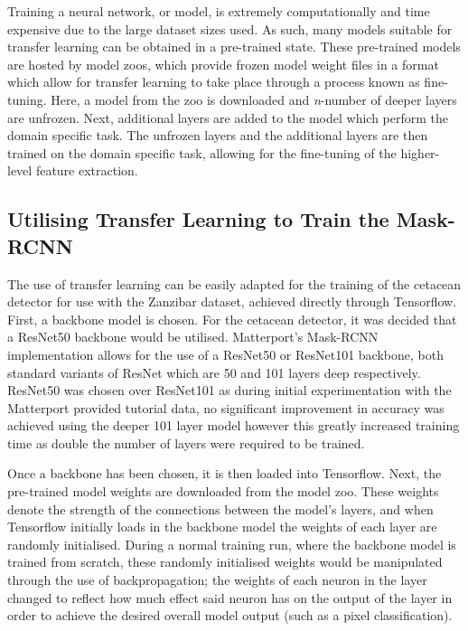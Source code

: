 Training a neural network, or model, is extremely computationally and time expensive due to the large dataset sizes used. As such, many models suitable for transfer learning can be obtained in a pre-trained state. These pre-trained models are hosted by model zoos, which provide frozen model weight files in a format which allow for transfer learning to take place through a process known as fine-tuning. Here, a model from the zoo is downloaded and \textit{n}-number of deeper layers are unfrozen. Next, additional layers are added to the model which perform the domain specific task. The unfrozen layers and the additional layers are then trained on the domain specific task, allowing for the fine-tuning of the higher-level feature extraction. 

\subsection{Utilising Transfer Learning to Train the Mask-RCNN}\label{ch:cetDet,sec:initialTesting,sub:transferLearningforTheDetector}

The use of transfer learning can be easily adapted for the training of the cetacean detector for use with the Zanzibar dataset, achieved directly through Tensorflow. First, a backbone model is chosen. For the cetacean detector, it was decided that a ResNet50 backbone would be utilised. Matterport's Mask-RCNN implementation allows for the use of a ResNet50 or ResNet101 backbone, both standard variants of ResNet which are 50 and 101 layers deep respectively. ResNet50 was chosen over ResNet101 as during initial experimentation with the Matterport provided tutorial data, no significant improvement in accuracy was achieved using the deeper 101 layer model however this greatly increased training time as double the number of layers were required to be trained. 

Once a backbone has been chosen, it is then loaded into Tensorflow. Next, the pre-trained model weights are downloaded from the model zoo. These weights denote the strength of the connections between the model's layers, and when Tensorflow initially loads in the backbone model the weights of each layer are randomly initialised. During a normal training run, where the backbone model is trained from scratch, these randomly initialised weights would be manipulated through the use of backpropagation; the weights of each neuron in the layer changed to reflect how much effect said neuron has on the output of the layer in order to achieve the desired overall model output (such as a pixel classification). 

